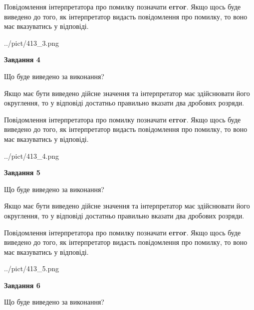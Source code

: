 \documentclass[12pt, ukrainian]{article}
\begin{document}
{\begin {Large}
Повідомлення інтерпретатора про помилку позначати \textbf{error}.
Якщо щось буде виведено до того, як інтерпретатор видасть повідомлення про помилку, 
то воно має вказуватись у відповіді. \par

\begin{center}
	{../pict/413_3.png}
\end{center}
\newpage

{\begin {center}\textbf{Завдання 4}\end {center}}\par
Що буде виведено за виконання? \par

Якщо має бути виведено дійсне значення та інтерпретатор має здійснювати його округлення, 
то у відповіді достатньо правильно вказати два дробових розряди.

Повідомлення інтерпретатора про помилку позначати \textbf{error}.
Якщо щось буде виведено до того, як інтерпретатор видасть повідомлення про помилку, 
то воно має вказуватись у відповіді. \par

\begin{center}
	{../pict/413_4.png}
\end{center}
\newpage

{\begin {center}\textbf{Завдання 5}\end {center}}\par
Що буде виведено за виконання? \par

Якщо має бути виведено дійсне значення та інтерпретатор має здійснювати його округлення, 
то у відповіді достатньо правильно вказати два дробових розряди.

Повідомлення інтерпретатора про помилку позначати \textbf{error}.
Якщо щось буде виведено до того, як інтерпретатор видасть повідомлення про помилку, 
то воно має вказуватись у відповіді. \par

\begin{center}
	{../pict/413_5.png}
\end{center}
\newpage

{\begin {center}\textbf{Завдання 6}\end {center}}\par
Що буде виведено за виконання? \par


\end{Large}}
\end{document}
